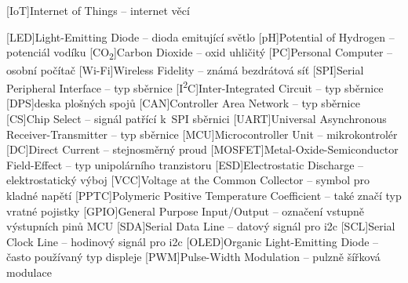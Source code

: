 \cleardoublepage
\chapter*{\listofabbrevname}
{}

\begin{acronym}[iotasdasdsd]

	[IoT]{Internet of Things -- internet věcí}

	[LED]{Light-Emitting Diode -- dioda emitující světlo}
	[pH]{Potential of Hydrogen -- potenciál vodíku}
	[CO\textsubscript{2}]{Carbon Dioxide -- oxid uhličitý}
	[PC]{Personal Computer -- osobní počítač}
	[Wi-Fi]{Wireless Fidelity -- známá bezdrátová síť}
	[SPI]{Serial Peripheral Interface -- typ sběrnice}
	[I\textsuperscript{2}C]{Inter-Integrated Circuit -- typ sběrnice}
	[DPS]{deska plošných spojů}
	[CAN]{Controller Area Network -- typ sběrnice}
	[CS]{Chip Select -- signál patřící k~SPI sběrnici}
	[UART]{Universal Asynchronous Receiver-Transmitter -- typ sběrnice}
	[MCU]{Microcontroller Unit -- mikrokontrolér}
	[DC]{Direct Current -- stejnosměrný proud}
	[MOSFET]{Metal-Oxide-Semiconductor Field-Effect -- typ unipolárního tranzistoru}
	[ESD]{Electrostatic Discharge -- elektrostatický výboj}
	[VCC]{Voltage at the Common Collector -- symbol pro kladné napětí}
	[PPTC]{Polymeric Positive Temperature Coefficient -- také značí typ vratné pojistky}
	[GPIO]{General Purpose Input/Output -- označení vstupně výstupních pinů MCU}
	[SDA]{Serial Data Line -- datový signál pro \acs{i2c}}
	[SCL]{Serial Clock Line -- hodinový signál pro \acs{i2c}}
	[OLED]{Organic Light-Emitting Diode -- často používaný typ displeje}
	[PWM]{Pulse-Width Modulation -- pulzně šířková modulace}

\end{acronym}

